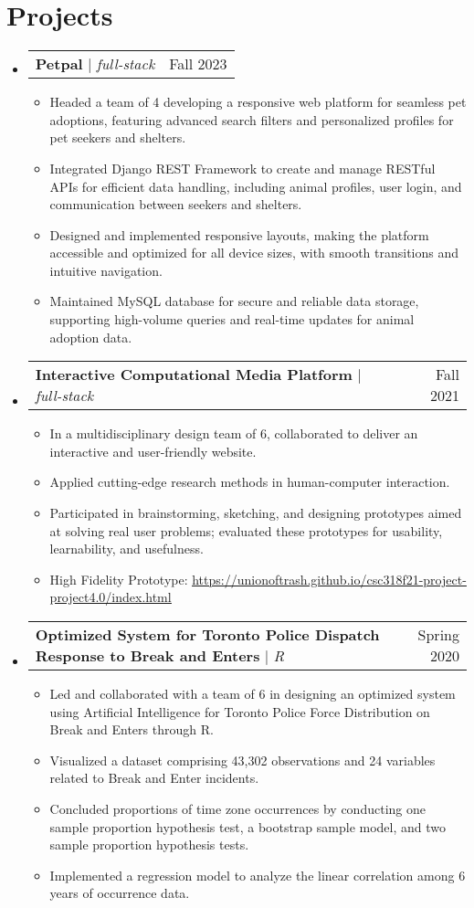 \documentclass[letterpaper,11pt]{article}
\makeatletter
\newcommand{\resumeItem}[1]{
  \item\small{
    {#1 \vspace{-2pt}}
  }
}
\newcommand{\resumeProjectHeading}[2]{
    \item
    \begin{tabular*}{0.97\textwidth}{l@{\extracolsep{\fill}}r}
      \small#1 & #2 \\
    \end{tabular*}\vspace{-7pt}
}
\newcommand{\resumeSubHeadingListStart}{\begin{itemize}[leftmargin=0.15in, label={}]}
\newcommand{\resumeSubHeadingListEnd}{\end{itemize}}
\newcommand{\resumeItemListStart}{\begin{itemize}}
\newcommand{\resumeItemListEnd}{\end{itemize}\vspace{-5pt}}
\makeatother
\begin{document}
\section{Projects}
    \resumeSubHeadingListStart
      \resumeProjectHeading
        {\textbf{Petpal } $|$ \emph{full-stack}}{Fall 2023}
          \resumeItemListStart
            \resumeItem{Headed a team of 4 developing a responsive web platform for seamless pet adoptions, featuring advanced search filters and personalized profiles for pet seekers and shelters.}
            \resumeItem{Integrated Django REST Framework to create and manage RESTful APIs for efficient data handling, including animal profiles, user login, and communication between seekers and shelters.}
            \resumeItem{Designed and implemented responsive layouts, making the platform accessible and optimized for all device sizes, with smooth transitions and intuitive navigation.}
            \resumeItem{Maintained MySQL database for secure and reliable data storage, supporting high-volume queries and real-time updates for animal adoption data.}
        \resumeItemListEnd
      \resumeProjectHeading
        {\textbf{Interactive Computational Media Platform } $|$ \emph{full-stack	}}{Fall 2021}
          \resumeItemListStart
            \resumeItem{In a multidisciplinary design team of 6, collaborated to deliver an interactive and user-friendly website.}
            \resumeItem{Applied cutting-edge research methods in human-computer interaction.}
            \resumeItem{Participated in brainstorming, sketching, and designing prototypes aimed at solving real user problems; evaluated these prototypes for usability, learnability, and usefulness.}
            \resumeItem{High Fidelity Prototype: \href{https://unionoftrash.github.io/csc318f21-project-project4.0/index.html}{\underline{https://unionoftrash.github.io/csc318f21-project-project4.0/index.html}}}
          \resumeItemListEnd
      \resumeProjectHeading
        {\textbf{Optimized System for Toronto Police Dispatch Response to Break and Enters} $|$ \emph{R}}{Spring 2020}
          \resumeItemListStart
            \resumeItem{Led and collaborated with a team of 6 in designing an optimized system using Artificial Intelligence for Toronto Police Force Distribution on Break and Enters through R.}
            \resumeItem{Visualized a dataset comprising 43,302 observations and 24 variables related to Break and Enter incidents.}
            \resumeItem{Concluded proportions of time zone occurrences by conducting one sample proportion hypothesis test, a bootstrap sample model, and two sample proportion hypothesis tests.}
            \resumeItem{Implemented a regression model to analyze the linear correlation among 6 years of occurrence data.}
          \resumeItemListEnd
    \resumeSubHeadingListEnd
\end{document}
